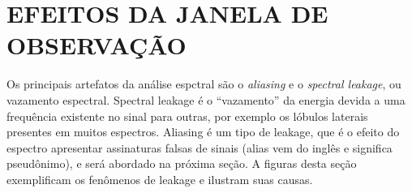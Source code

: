 

\chapter{EFEITOS DA JANELA DE OBSERVAÇÃO}

Os principais artefatos da análise espctral são o \textit{aliasing} e o \textit{spectral leakage}, ou vazamento espectral. Spectral leakage é o ``vazamento'' da energia devida a uma frequência existente no sinal para outras, por exemplo os lóbulos laterais presentes em muitos espectros. Aliasing é um tipo de leakage, que é o efeito do espectro apresentar assinaturas falsas de sinais (alias vem do inglês e significa pseudônimo), e será abordado na próxima seção. A figuras desta seção exemplificam os fenômenos de leakage e ilustram suas causas.

